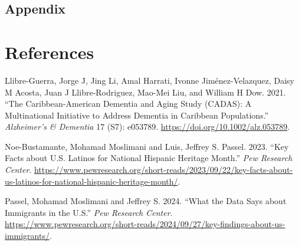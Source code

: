 \documentclass[
]{article}
\newlength{\cslhangindent}
\newenvironment{CSLReferences}[2] %
 {\begin{list}{}{%
  \setlength{\itemindent}{0pt}
  \setlength{\leftmargin}{0pt}
  \setlength{\parsep}{0pt}
  \ifodd #1
   \setlength{\leftmargin}{\cslhangindent}
   \setlength{\itemindent}{-1\cslhangindent}
  \fi
  \setlength{\itemsep}{#2\baselineskip}}}
 {\end{list}}
\begin{document}
\subsection{Appendix}\label{appendix}

\section*{References}\label{references}

\label{refs}
\begin{CSLReferences}{1}{0}
Llibre-Guerra, Jorge J, Jing Li, Amal Harrati, Ivonne Jiménez-Velazquez,
Daisy M Acosta, Juan J Llibre-Rodriguez, Mao-Mei Liu, and William H Dow.
2021. {``The {Caribbean}-{American} {Dementia} and {Aging} {Study}
({CADAS}): {A} Multinational Initiative to Address Dementia in
{Caribbean} Populations.''} \emph{Alzheimer's \& Dementia} 17 (S7):
e053789. \url{https://doi.org/10.1002/alz.053789}.

Noe-Bustamante, Mohamad Moslimani and Luis, Jeffrey S. Passel. 2023.
{``Key Facts about {U}.{S}. {Latinos} for {National} {Hispanic}
{Heritage} {Month}.''} \emph{Pew Research Center}.
\url{https://www.pewresearch.org/short-reads/2023/09/22/key-facts-about-us-latinos-for-national-hispanic-heritage-month/}.

Passel, Mohamad Moslimani and Jeffrey S. 2024. {``What the Data Says
about Immigrants in the {U}.{S}.''} \emph{Pew Research Center}.
\url{https://www.pewresearch.org/short-reads/2024/09/27/key-findings-about-us-immigrants/}.

\end{CSLReferences}
\end{document}
